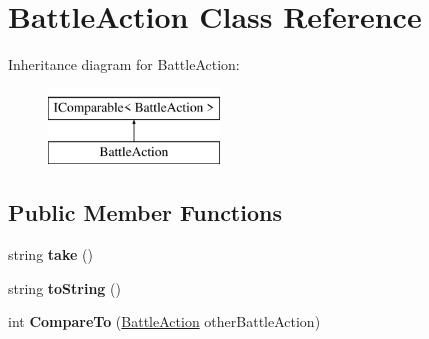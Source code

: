 \hypertarget{class_battle_action}{}\section{Battle\+Action Class Reference}
\label{class_battle_action}
Inheritance diagram for Battle\+Action\+:\begin{figure}[H]
\begin{center}
\leavevmode
\includegraphics[height=2.000000cm]{class_battle_action}
\end{center}
\end{figure}
\subsection*{Public Member Functions}
\begin{DoxyCompactItemize}
\item 
string {\bfseries take} ()\hypertarget{class_battle_action_a05b20b47b44ed3464934ce18d5837897}{}\label{class_battle_action_a05b20b47b44ed3464934ce18d5837897}

\item 
string {\bfseries to\+String} ()\hypertarget{class_battle_action_ad2bbb9fbfbc11dcdf0ef316a0873dd03}{}\label{class_battle_action_ad2bbb9fbfbc11dcdf0ef316a0873dd03}

\item 
int {\bfseries Compare\+To} (\hyperlink{class_battle_action}{Battle\+Action} other\+Battle\+Action)\hypertarget{class_battle_action_a07eb9cb623bdd6a47dd6df88583b0b39}{}\label{class_battle_action_a07eb9cb623bdd6a47dd6df88583b0b39}

\end{DoxyCompactItemize}
